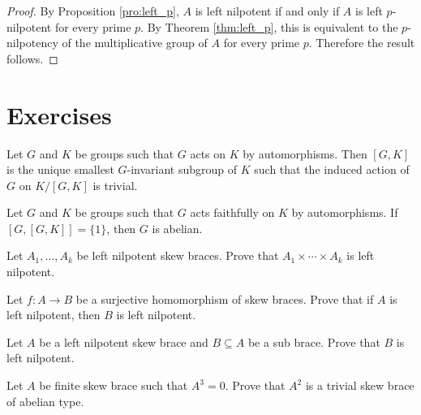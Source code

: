 \begin{proof}
By Proposition \ref{pro:left_p}, $A$ is left nilpotent if and only if $A$ is left $p$-nilpotent for every prime $p$. By Theorem \ref{thm:left_p}, this is equivalent to the $p$-nilpotency of the multiplicative group of $A$ for every prime $p$. Therefore the result follows.
\end{proof}

\section*{Exercises}
\begin{prob}
Let $G$ and $K$ be groups such that $G$ acts on $K$ by automorphisms. Then $[G,K]$ is the unique smallest $G$-invariant 
subgroup of $K$ such that the induced action of $G$ on $K/[G,K]$ is trivial. 	
\end{prob}


\begin{prob}
Let $G$ and $K$ be groups such that $G$ acts faithfully on $K$ by automorphisms. If $[G,[G,K]]=\{1\}$, then $G$ is abelian. 	
\end{prob}


\begin{prob}
    \label{prob:LN_direct}
    Let $A_1,\dots,A_k$ be left nilpotent skew braces. Prove that 
    $A_1\times\cdots\times A_k$ is left nilpotent.
\end{prob}

\begin{prob}
    \label{prob:LN_surj}
     Let $f\colon A\to B$ be a surjective homomorphism of skew braces. Prove that 
     if $A$ is left nilpotent, then $B$ is left nilpotent.
\end{prob}

\begin{prob}
    \label{prob:LN_sub}
    Let $A$ be a left nilpotent skew brace and $B\subseteq A$ be a sub brace. 
    Prove that $B$ is left nilpotent.
\end{prob}



\begin{prob}
    Let $A$ be finite skew brace such that $A^3=0$. Prove that 
    $A^2$ is a trivial skew brace of abelian type.
\end{prob}

